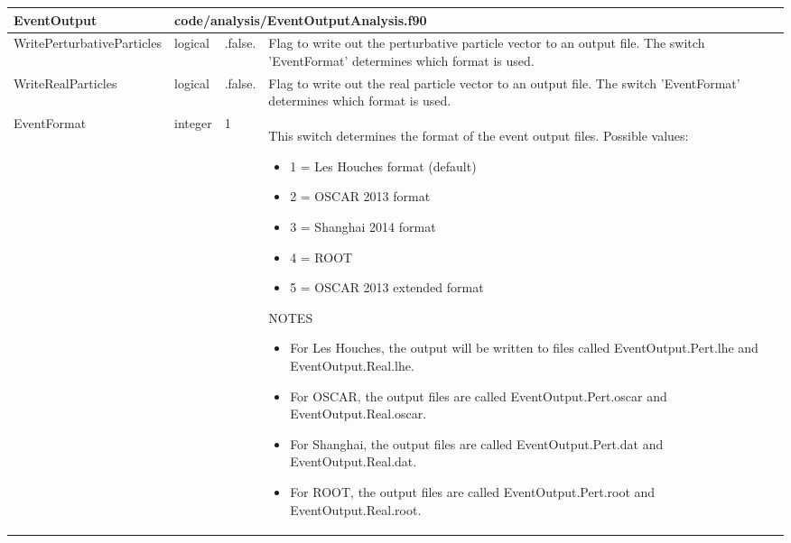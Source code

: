 \documentclass{article}
\begin{document}

\begin{longtable}{llll}
\toprule
\textbf{\large{EventOutput}} & \multicolumn{3}{l}{\footnotesize{code/analysis/EventOutputAnalysis.f90}}\\*
\midrule
\endfirsthead
\midrule
\endhead
WritePerturbativeParticles & \begin{minipage}[t]{2cm}logical\end{minipage} & \begin{minipage}[t]{2cm}.false.\end{minipage} & \begin{minipage}[t]{12cm}Flag to write out the perturbative particle vector to an output file. The switch 'EventFormat' determines which format is used.\end{minipage}\\*
\midrule
WriteRealParticles & \begin{minipage}[t]{2cm}logical\end{minipage} & \begin{minipage}[t]{2cm}.false.\end{minipage} & \begin{minipage}[t]{12cm}Flag to write out the real particle vector to an output file. The switch 'EventFormat' determines which format is used.\end{minipage}\\*
\midrule
EventFormat & \begin{minipage}[t]{2cm}integer\end{minipage} & \begin{minipage}[t]{2cm}1\end{minipage} & \begin{minipage}[t]{12cm}This switch determines the format of the event output files. Possible values:\begin{itemize}\leftmargin0em\itemindent0pt\item 1 = Les Houches format (default)\item 2 = OSCAR 2013 format\item 3 = Shanghai 2014 format\item 4 = ROOT\item 5 = OSCAR 2013 extended format\end{itemize}NOTES\begin{itemize}\leftmargin0em\itemindent0pt\item For Les Houches, the output will be written to files called   EventOutput.Pert.lhe and EventOutput.Real.lhe.\item For OSCAR, the output files are called EventOutput.Pert.oscar and   EventOutput.Real.oscar.\item For Shanghai, the output files are called EventOutput.Pert.dat and   EventOutput.Real.dat.\item For ROOT, the output files are called EventOutput.Pert.root and   EventOutput.Real.root.\end{itemize}\end{minipage}\\*

\end{longtable}
\end{document}
